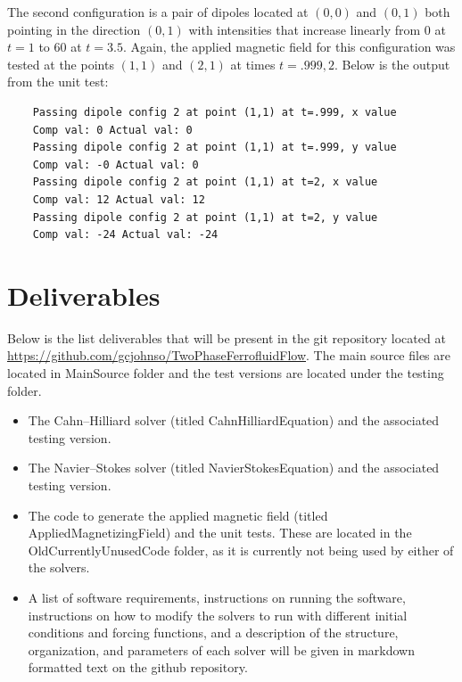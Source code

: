 \documentclass[11pt,fullpage]{article}
\theoremstyle{lemma}
\theoremstyle{definition}
\theoremstyle{lemma}
\begin{document}
The second configuration is a pair of dipoles located at $(0,0)$ and $(0,1)$ both pointing in the direction $(0,1)$ with intensities that increase linearly from $0$ at $t=1$ to $60$ at $t=3.5$. Again, the applied magnetic field for this configuration was tested at the points $(1,1)$ and $(2,1)$ at times $t=.999,2$. Below is the output from the unit test:
\begin{verbatim}
	Passing dipole config 2 at point (1,1) at t=.999, x value
	Comp val: 0 Actual val: 0
	Passing dipole config 2 at point (1,1) at t=.999, y value
	Comp val: -0 Actual val: 0
	Passing dipole config 2 at point (1,1) at t=2, x value
	Comp val: 12 Actual val: 12
	Passing dipole config 2 at point (1,1) at t=2, y value
	Comp val: -24 Actual val: -24
\end{verbatim}

\section{Deliverables}
Below is the list deliverables that will be present in the git repository located at \url{https://github.com/gcjohnso/TwoPhaseFerrofluidFlow}. The main source files are located in MainSource folder and the test versions are located under the testing folder.
\begin{itemize}
	\item The Cahn--Hilliard solver (titled CahnHilliardEquation) and the associated testing version.
	
	\item The Navier--Stokes solver (titled NavierStokesEquation) and the associated testing version.
	
	\item The code to generate the applied magnetic field (titled AppliedMagnetizingField) and the unit tests. These are located in the OldCurrentlyUnusedCode folder, as it is currently not being used by either of the solvers.
	
	\item A list of software requirements, instructions on running the software, instructions on how to modify the solvers to run with different initial conditions and forcing functions, and a description of the structure, organization, and parameters of each solver will be given in markdown formatted text on the github repository.
\end{itemize}
\end{document}
